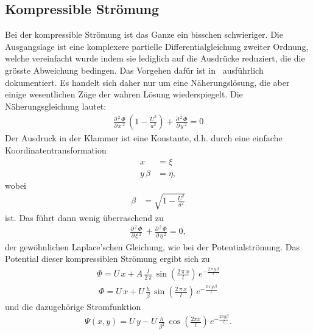 \subsection{Kompressible Strömung}
Bei der kompressible Strömung ist das Ganze ein bisschen schwieriger.
Die Ausgangslage ist eine komplexere partielle 
Differentialgleichung zweiter Ordnung, welche vereinfacht
wurde indem sie lediglich auf die Ausdrücke reduziert, die 
die grösste Abweichung bedingen.
Das Vorgehen dafür ist in~\cite{Ackeret1928} ausführlich dokumentiert.
Es handelt sich daher nur um eine Näherungslösung,
die aber einige wesentlichen Züge der wahren Lösung wiederspiegelt.
Die Näherungsgleichung lautet:
\begin{align*}
    \frac{\partial\,^2\,\Phi}{\partial\,x\,^2}\,
    \left(1-\frac{U^2}{a^2}\right)
    +
    \frac{\partial\,^2\,\Phi}{\partial\,y\,^2}
    =
    0
\end{align*}
Der Ausdruck in der Klammer ist eine Konstante, d.h.
durch eine einfache Koordinatentransformation
\begin{align*}
    x 
    &=
    \xi \\
    y\,\beta
    &=
    \eta,
\end{align*}
wobei
\begin{align*}
    \beta
    &=
    \sqrt{1-\frac{U^2}{a^2}}
\end{align*}
ist.
Das führt dann wenig überraschend zu
\begin{align*}
    \frac{\partial\,^2\,\Phi}{\partial\,\xi\,^2}\,
    +
    \frac{\partial\,^2\,\Phi}{\partial\,\eta\,^2}
    =
    0,
\end{align*}
der gewöhnlichen Laplace'schen Gleichung, wie
bei der Potentialströmung.
Das Potential dieser kompressiblen Strömung ergibt sich zu
\begin{align*}
    \Phi
    =
    U\,x + A\,\frac{l}{2\,\pi}\,\sin\left(\frac{2\,\pi\,x}{l}\right)
    \,e^{-\frac{2\,\pi\,y\,\beta}{l}}
\end{align*}
\begin{align*}
    \Phi
    =
    U\,x + U\,\frac{h}{\beta}\,\sin\left(\frac{2\,\pi\,x}{l}\right)
    \,e^{-\frac{2\,\pi\,y\,\beta}{l}}
\end{align*}
und die dazugehörige Stromfunktion
\begin{align*}
    \Psi(x, y)
    =
    U\,y - U\,\frac{h}{\beta^2}\,\cos\left(\frac{2\pi x}{l}\right)
    \,e^{-\frac{2\pi y \beta}{l}}.
\end{align*}

